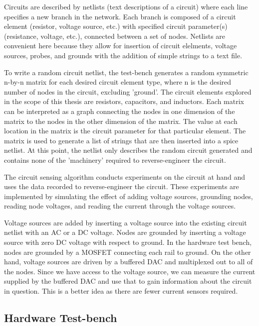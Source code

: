 \documentclass[11pt, a4paper]{article}
\begin{document}
Circuits are described by netlists (text descriptions of a circuit) where each line specifies a new branch in the network.
Each branch is composed of a circuit element (resistor, voltage source, etc.) with specified circuit parameter(s) (resistance, voltage, etc.), connected between a set of nodes.
Netlists are convenient here because they allow for insertion of circuit elelments, voltage sources, probes, and grounds with the addition of simple strings to a text file.

To write a random circuit netlist, the test-bench generates a random symmetric n-by-n matrix for each desired circuit element type, where n is the desired number of nodes in the circuit, excluding 'ground'.
The circuit elements explored in the scope of this thesis are resistors, capacitors, and inductors.
Each matrix can be interpreted as a graph connecting the nodes in one dimension of the matrix to the nodes in the other dimension of the matrix.
The value at each location in the matrix is the circuit parameter for that particular element.  
The matrix is used to generate a list of strings that are then inserted into a spice netlist.
At this point, the netlist only describes the random circuit generated and contains none of the 'machinery' required to reverse-engineer the circuit.

The circuit sensing algorithm conducts experiments on the circuit at hand and uses the data recorded to reverse-engineer the circuit.
These experiments are implemented by simulating the effect of adding voltage sources, grounding nodes, reading node voltages, and reading the current through the voltage sources.

Voltage sources are added by inserting a voltage source into the existing circuit netlist with an AC or a DC voltage.
Nodes are grounded by inserting a voltage source with zero DC voltage with respect to ground.
In the hardware test bench, nodes are grounded by a MOSFET connecting each rail to ground.
On the other hand, voltage sources are driven by a buffered DAC and multiplexed out to all of the nodes.
Since we have access to the voltage source, we can measure the current supplied by the buffered DAC and use that to gain information about the circuit in question.
This is a better idea as there are fewer current sensors required.


\subsection{Hardware Test-bench}
\end{document}
